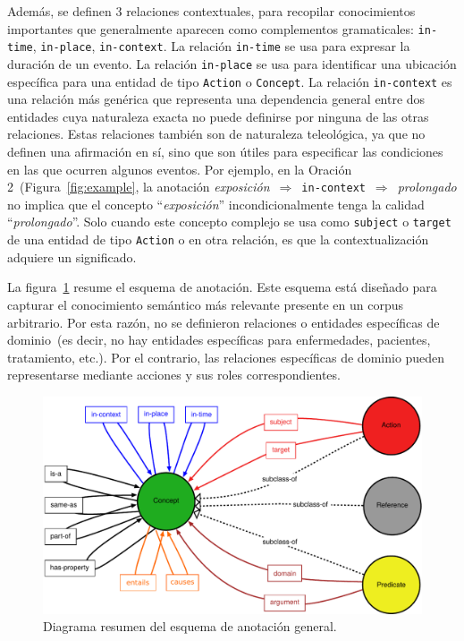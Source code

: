 Además, se definen 3 relaciones contextuales, para recopilar conocimientos importantes que generalmente aparecen como complementos gramaticales: \texttt{in-time}, \texttt{in-place}, \texttt{in-context}.
La relación \texttt{in-time} se usa para expresar la duración de un evento.
La relación \texttt{in-place} se usa para identificar una ubicación específica para una entidad de tipo \texttt{Action} o \texttt{Concept}.
La relación \texttt{in-context} es una relación más genérica que representa una dependencia general entre dos entidades cuya naturaleza exacta no puede definirse por ninguna de las otras relaciones.
Estas relaciones también son de naturaleza teleológica, ya que no definen una afirmación en sí, sino que son útiles para especificar las condiciones en las que ocurren algunos eventos.
Por ejemplo, en la Oración 2~(Figura~\ref{fig:example}, la anotación \textit{exposición}~$\Rightarrow$~\texttt{in-context}~$\Rightarrow$~\textit {prolongado} no implica que el concepto ``\textit{exposición}'' incondicionalmente tenga la calidad ``\textit{prolongado}''. Solo cuando este concepto complejo se usa como \texttt{subject} o \texttt{target} de una entidad de tipo \texttt{Action} o en otra relación, es que la contextualización adquiere un significado.

La figura~\ref{fig:model} resume el esquema de anotación. Este esquema está diseñado para capturar el conocimiento semántico más relevante presente en un corpus arbitrario.
Por esta razón, no se definieron relaciones o entidades específicas de dominio~(es decir, no hay entidades específicas para enfermedades, pacientes, tratamiento, etc.).
Por el contrario, las relaciones específicas de dominio pueden representarse mediante acciones y sus roles correspondientes.

\begin{figure}[htb]
    \includegraphics[width=\textwidth]{Images/Chapters/AnnotationModelDiagram.pdf}
    \caption{Diagrama resumen del esquema de anotación general.}
    \label{fig:model}
\end{figure}

